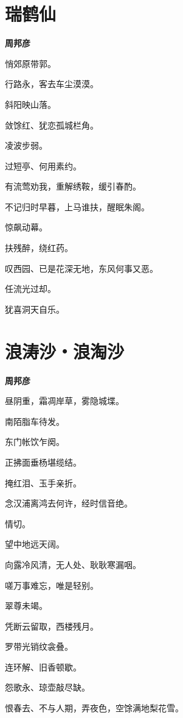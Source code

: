 \documentclass[12pt,a4paper]{ctexbook}
\begin{document}
\section{瑞鹤仙}
\textbf{周邦彦}\par\vspace{0.5em}
悄郊原带郭。\par
行路永，客去车尘漠漠。\par
斜阳映山落。\par
敛馀红、犹恋孤城栏角。\par
凌波步弱。\par
过短亭、何用素约。\par
有流莺劝我，重解绣鞍，缓引春酌。\par
不记归时早暮，上马谁扶，醒眠朱阁。\par
惊飙动幕。\par
扶残醉，绕红药。\par
叹西园、已是花深无地，东风何事又恶。\par
任流光过却。\par
犹喜洞天自乐。\par

\section{浪涛沙・浪淘沙}
\textbf{周邦彦}\par\vspace{0.5em}
昼阴重，霜凋岸草，雾隐城堞。\par
南陌脂车待发。\par
东门帐饮乍阕。\par
正拂面垂杨堪缆结。\par
掩红泪、玉手亲折。\par
念汉浦离鸿去何许，经时信音绝。\par
情切。\par
望中地远天阔。\par
向露冷风清，无人处、耿耿寒漏咽。\par
嗟万事难忘，唯是轻别。\par
翠尊未竭。\par
凭断云留取，西楼残月。\par
罗带光销纹衾叠。\par
连环解、旧香顿歇。\par
怨歌永、琼壶敲尽缺。\par
恨春去、不与人期，弄夜色，空馀满地梨花雪。\par
\end{document}
